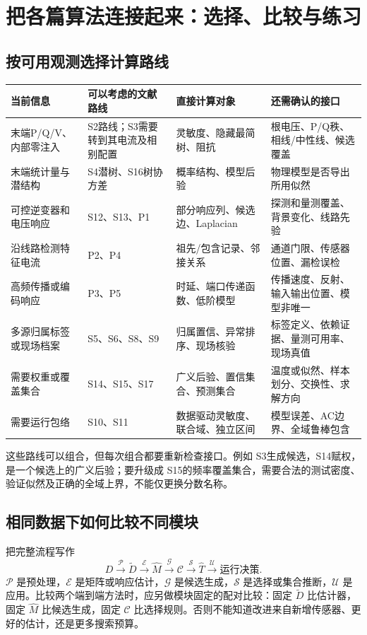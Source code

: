 \chapter{把各篇算法连接起来：选择、比较与练习}
\label{ch:integration}
\section{按可用观测选择计算路线}
\begin{longtable}{p{}p{}p{}p{}}
\toprule 当前信息 & 可以考虑的文献路线 & 直接计算对象 & 还需确认的接口\\\midrule\endhead
末端P/Q/V、内部零注入 & S2路线；S3需要转到其电流及相别配置 & 灵敏度、隐藏最简树、阻抗 & 根电压、P/Q秩、相线/中性线、候选覆盖\\
末端统计量与潜结构 & S4潜树、S16树协方差 & 概率结构、模型后验 & 物理模型是否导出所用似然\\
可控逆变器和电压响应 & S12、S13、P1 & 部分响应列、候选边、Laplacian & 探测和量测覆盖、背景变化、线路先验\\
沿线路检测特征电流 & P2、P4 & 祖先/包含记录、邻接关系 & 通道门限、传感器位置、漏检误检\\
高频传播或编码响应 & P3、P5 & 时延、端口传递函数、低阶模型 & 传播速度、反射、输入输出位置、模型非唯一\\
多源归属标签或现场档案 & S5、S6、S8、S9 & 归属置信、异常排序、现场核验 & 标签定义、依赖证据、量测可用率、现场真值\\
需要权重或覆盖集合 & S14、S15、S17 & 广义后验、置信集合、预测集合 & 温度或似然、样本划分、交换性、求解方向\\
需要运行包络 & S10、S11 & 数据驱动灵敏度、联合域、独立区间 & 模型误差、AC边界、全域鲁棒包含\\
\bottomrule
\end{longtable}
这些路线可以组合，但每次组合都要重新检查接口。例如 S3生成候选，S14赋权，是一个候选上的广义后验；要升级成 S15的频率覆盖集合，需要合法的测试密度、验证似然及正确的全域上界，不能仅更换分数名称。

\section{相同数据下如何比较不同模块}
把完整流程写作
\begin{equation}
 D\xrightarrow{\mathcal P}\widetilde D
 \xrightarrow{\mathcal E}\widehat M
 \xrightarrow{\mathcal G}\mathcal C
 \xrightarrow{\mathcal S}\widehat T
 \xrightarrow{\mathcal U}\text{运行决策}.
\end{equation}
$\mathcal P$ 是预处理，$\mathcal E$ 是矩阵或响应估计，$\mathcal G$ 是候选生成，$\mathcal S$ 是选择或集合推断，$\mathcal U$ 是应用。比较两个端到端方法时，应另做模块固定的配对比较：固定 $\widetilde D$ 比估计器，固定 $\widehat M$ 比候选生成，固定 $\mathcal C$ 比选择规则。否则不能知道改进来自新增传感器、更好的估计，还是更多搜索预算。

